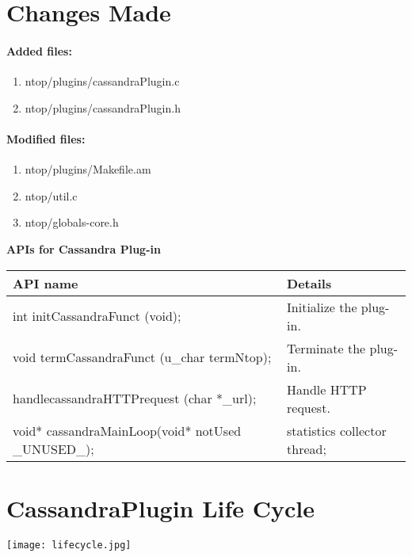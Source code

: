 \documentclass[12 pt , a4paper ]{report}
\begin{document}
\section{Changes Made}
\paragraph{Added files:}
\begin{enumerate}
 \item ntop/plugins/cassandraPlugin.c
 \item ntop/plugins/cassandraPlugin.h
\end{enumerate}
\paragraph{Modified files:}
\begin{enumerate}
 \item ntop/plugins/Makefile.am
 \item ntop/util.c
 \item ntop/globals-core.h
\end{enumerate}

\textbf{APIs for Cassandra Plug-in}\\

\begin{tabular}{|l|l|}
\hline
\cellcolor{blue!40} \textbf{API name} & \cellcolor{blue!40} \textbf{Details}\\
\hline
 int initCassandraFunct (void); & Initialize the plug-in.\\
 \hline
 void termCassandraFunct (u\_char termNtop); & Terminate the plug-in.\\
 \hline
 handlecassandraHTTPrequest (char *\_url); & Handle HTTP request.\\
 \hline
  void* cassandraMainLoop(void* notUsed \_UNUSED\_); & statistics collector thread;\\
  \hline
\end{tabular}

\section{CassandraPlugin Life Cycle}
\texttt{[image: lifecycle.jpg]}
\end{document}
